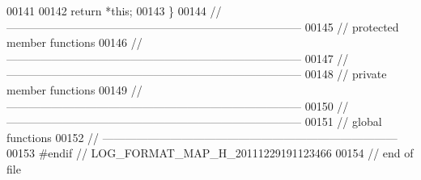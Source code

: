 \begin{DoxyCode}
00141     
00142     \textcolor{keywordflow}{return} *\textcolor{keyword}{this};
00143 \}
00144 \textcolor{comment}{//
      ------------------------------------------------------------------------------}
00145 \textcolor{comment}{// protected member functions}
00146 \textcolor{comment}{//
      ------------------------------------------------------------------------------}
00147 \textcolor{comment}{//
      ------------------------------------------------------------------------------}
00148 \textcolor{comment}{// private member functions}
00149 \textcolor{comment}{//
      ------------------------------------------------------------------------------}
00150 \textcolor{comment}{//
      ------------------------------------------------------------------------------}
00151 \textcolor{comment}{// global functions}
00152 \textcolor{comment}{//
      ------------------------------------------------------------------------------}
00153 \textcolor{preprocessor}{#endif // LOG\_FORMAT\_MAP\_H\_20111229191123466}
00154 \textcolor{preprocessor}{}\textcolor{comment}{// end of file}
\end{DoxyCode}
